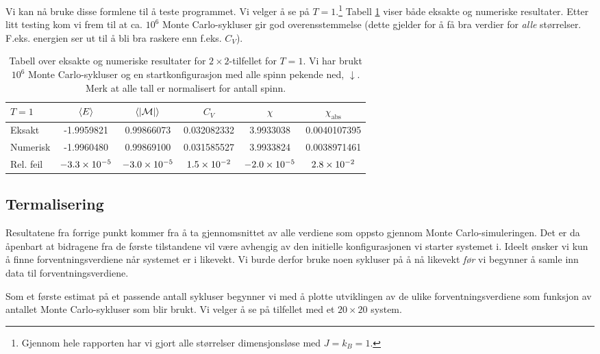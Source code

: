 \documentclass[11pt, twocolumn]{article}
\newcommand{\abs}[1]{|#1|}
\begin{document}
Vi kan nå bruke disse formlene til å teste programmet. Vi velger å se
på $T=1$.\footnote{Gjennom hele rapporten har vi gjort alle
  størrelser dimensjonsløse med $J=k_B=1$.} Tabell \ref{tab:2x2-eksakt-num} viser både eksakte og
numeriske resultater. Etter litt testing kom vi frem til at ca. $10^6$
Monte Carlo-sykluser gir god overensstemmelse (dette gjelder for å få
bra verdier for \textit{alle} størrelser. F.eks. energien ser ut til å bli bra
raskere enn f.eks. $C_V$).


\begin{table}
\centering
\caption{Tabell over eksakte og numeriske resultater for $2\times
  2$-tilfellet for $T=1$. Vi har brukt $10^6$ Monte Carlo-sykluser og
  en startkonfigurasjon med alle spinn pekende ned, $\downarrow$. Merk at
alle tall er normalisert for antall spinn.}
\label{tab:2x2-eksakt-num}
\vspace{0.1cm}
\begin{tabular}{l|ccccc}
$T=1$ & $\langle E \rangle$ & $\mean{ \abs{\mathcal{M} } }$ & $C_V$ & $\chi$ & $\chi_\text{abs}$ \\
\hline
Eksakt & -1.9959821 & 0.99866073 & 0.032082332 & 3.9933038 & 0.0040107395 \\
Numerisk & -1.9960480 & 0.99869100 & 0.031585527 & 3.9933824 & 0.0038971461 \\
Rel. feil & $-3.3\times 10^{-5}$ & $-3.0\times 10^{-5}$ & $1.5\times 10^{-2}$  & $-2.0\times 10^{-5}$ & $2.8\times 10^{-2}$ 
\end{tabular}
\end{table}



\subsection{Termalisering}
Resultatene fra forrige punkt kommer fra å ta gjennomsnittet av alle
verdiene som oppsto gjennom Monte Carlo-simuleringen. Det er da
åpenbart at bidragene fra de første tilstandene vil være avhengig av
den initielle konfigurasjonen vi starter systemet i. Ideelt ønsker vi
kun å finne forventningsverdiene når systemet er i likevekt. Vi burde
derfor bruke noen sykluser på å nå likevekt \textit{før} vi
begynner å samle inn data til forventningsverdiene. 

Som et første estimat på et passende antall sykluser begynner vi med å
plotte utviklingen av de ulike forventningsverdiene som funksjon av
antallet Monte Carlo-sykluser som blir brukt. Vi velger å se på
tilfellet med et $20\times 20$ system. 
\end{document}
